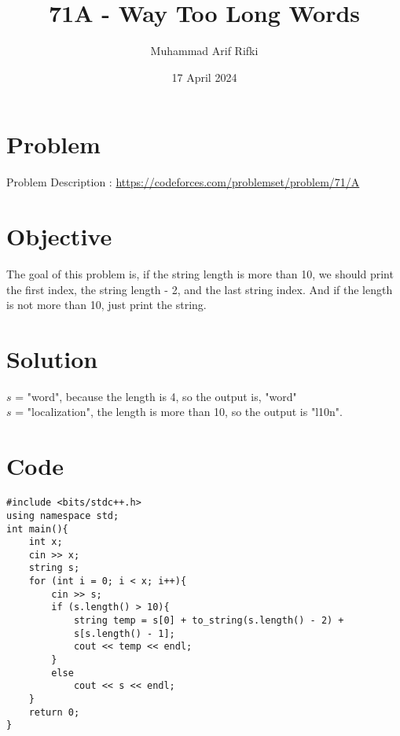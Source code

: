 \documentclass{article}
\title{71A -  Way Too Long Words}
\author{Muhammad Arif Rifki}
\date{17 April 2024}
\begin{document}
\maketitle


\section{Problem}

Problem Description : \href{https://codeforces.com/problemset/problem/71/A}{https://codeforces.com/problemset/problem/71/A}

\section{Objective}

The goal of this problem is, if the string length is more than 10, we should print the first index, the string length - 2, and the last string index. And if the length is not more than 10, just print the string.

\section{Solution}

$s$ = "word", because the length is 4, so the output is, "word"
\\$s$ = "localization", the length is more than 10, so the output is "l10n".


\newpage
\section{Code}

\begin{lstlisting}
#include <bits/stdc++.h>
using namespace std;
int main(){
    int x;
    cin >> x;
    string s;
    for (int i = 0; i < x; i++){
        cin >> s;
        if (s.length() > 10){
            string temp = s[0] + to_string(s.length() - 2) + 
            s[s.length() - 1];
            cout << temp << endl;
        }
        else
            cout << s << endl;
    }
    return 0;
}

\end{lstlisting}
\end{document}
